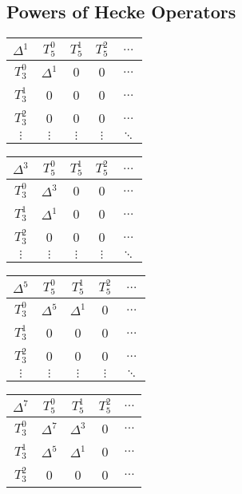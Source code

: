 \subsection{Powers of Hecke Operators}
\label{table:PowersHeckeOperators}
\begin{center}
\begin{tabular}{|c|cccc|}
	\hline
	\textbf{$\Delta^1$} & \textbf{$T_5^0$} & \textbf{$T_5^1$} & \textbf{$T_5^2$} & \textbf{$\dots$} \\\hline
	$T_3^0$ & $\Delta^1$ & 0 & 0 & $\dots$ \\
	$T_3^1$ & 0 & 0 & 0 & $\dots$ \\
	$T_3^2$ & 0 & 0 & 0 & $\dots$ \\
	$\vdots$ & $\vdots$ & $\vdots$ & $\vdots$ & $\ddots$ \\\hline
\end{tabular}
\begin{tabular}{|c|cccc|}
	\hline
	\textbf{$\Delta^3$} & \textbf{$T_5^0$} & \textbf{$T_5^1$} & \textbf{$T_5^2$} & \textbf{$\dots$} \\\hline
	$T_3^0$ & $\Delta^3$ & 0 & 0 & $\dots$ \\
	$T_3^1$ & $\Delta^1$ & 0 & 0 & $\dots$ \\
	$T_3^2$ & 0 & 0 & 0 & $\dots$ \\
	$\vdots$ & $\vdots$ & $\vdots$ & $\vdots$ & $\ddots$ \\\hline
\end{tabular}
\begin{tabular}{|c|cccc|}
	\hline
	\textbf{$\Delta^5$} & \textbf{$T_5^0$} & \textbf{$T_5^1$} & \textbf{$T_5^2$} & \textbf{$\dots$} \\\hline
	$T_3^0$ & $\Delta^5$ & $\Delta^1$ & 0 & $\dots$ \\
	$T_3^1$ & 0 & 0 & 0 & $\dots$ \\
	$T_3^2$ & 0 & 0 & 0 & $\dots$ \\
	$\vdots$ & $\vdots$ & $\vdots$ & $\vdots$ & $\ddots$ \\\hline
\end{tabular}
\begin{tabular}{|c|cccc|}
	\hline
	\textbf{$\Delta^7$} & \textbf{$T_5^0$} & \textbf{$T_5^1$} & \textbf{$T_5^2$} & \textbf{$\dots$} \\\hline
	$T_3^0$ & $\Delta^7$ & $\Delta^3$ & 0 & $\dots$ \\
	$T_3^1$ & $\Delta^5$ & $\Delta^1$ & 0 & $\dots$ \\
	$T_3^2$ & 0 & 0 & 0 & $\dots$ \\

\end{tabular}
\end{center}
